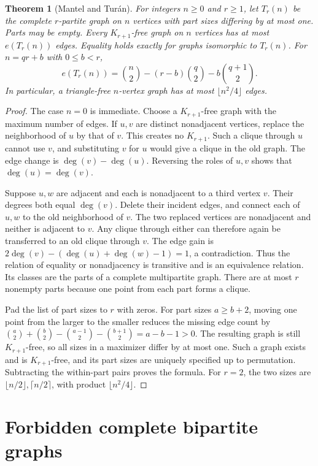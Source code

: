 \documentclass[11pt,oneside,openany]{book}
\theoremstyle{plain}
\newtheorem{theorem}{Theorem}[chapter]
\theoremstyle{definition}
\theoremstyle{remark}
\begin{document}
\begin{theorem}[Mantel and Tur\'an]\label{p205:W01}
For integers \(n\ge 0\) and \(r\ge 1\), let \(T_r(n)\) be the complete
\(r\)-partite graph on \(n\) vertices with part sizes differing by at
most one. Parts may be empty. Every \(K_{r+1}\)-free graph on \(n\)
vertices has at most \(e(T_r(n))\) edges. Equality holds exactly for
graphs isomorphic to \(T_r(n)\). For \(n=qr+b\) with \(0\le b<r\),
\[
 e(T_r(n))=\binom n2-(r-b)\binom q2-b\binom{q+1}2.
\]
In particular, a triangle-free \(n\)-vertex graph has at most
\(\lfloor n^2/4\rfloor\) edges.
\end{theorem}
\begin{proof}
The case \(n=0\) is immediate. Choose a \(K_{r+1}\)-free graph with the
maximum number of edges. If \(u,v\) are distinct nonadjacent vertices,
replace the neighborhood of \(u\) by that of \(v\). This creates no
\(K_{r+1}\). Such a clique through \(u\) cannot use \(v\), and substituting
\(v\) for \(u\) would give a clique in the old graph. The edge change is
\(\deg(v)-\deg(u)\). Reversing the roles of \(u,v\) shows that
\(\deg(u)=\deg(v)\).

Suppose \(u,w\) are adjacent and each is nonadjacent to a third vertex
\(v\). Their degrees both equal \(\deg(v)\). Delete their incident
edges, and connect each of \(u,w\) to the old neighborhood of \(v\).
The two replaced vertices are nonadjacent and neither is adjacent to
\(v\). Any clique through either can therefore again be transferred
to an old clique through \(v\). The edge gain is
\(2\deg(v)-(\deg(u)+\deg(w)-1)=1\), a contradiction. Thus the relation
of equality or nonadjacency is transitive and is an equivalence
relation. Its classes are the parts of a complete multipartite graph.
There are at most \(r\) nonempty parts because one point from each part
forms a clique.

Pad the list of part sizes to \(r\) with zeros. For part sizes \(a\ge b+2\),
moving one point from the larger to the smaller reduces the missing
edge count by
\(\binom a2+\binom b2-\binom{a-1}2-\binom{b+1}2=a-b-1>0\).
The resulting graph is still \(K_{r+1}\)-free, so all sizes in a
maximizer differ by at most one. Such a graph exists and is
\(K_{r+1}\)-free, and its part sizes are uniquely specified up to
permutation. Subtracting the within-part pairs proves the formula.
For \(r=2\), the two sizes are \(\lfloor n/2\rfloor,\lceil n/2\rceil\),
with product \(\lfloor n^2/4\rfloor\).
\end{proof}

\section{Forbidden complete bipartite graphs}
\end{document}
